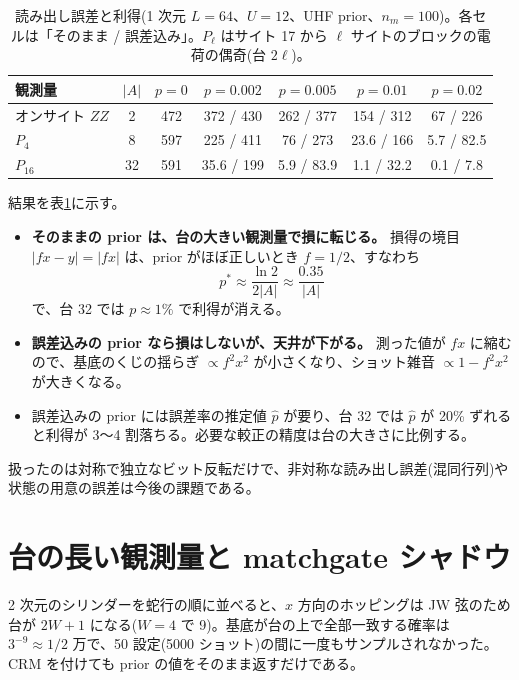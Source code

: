 \begin{table}[t]
\centering\small
\caption{読み出し誤差と利得(1 次元 $L=64$、$U=12$、UHF prior、$n_m=100$)。各セルは「そのまま / 誤差込み」。$P_\ell$ はサイト 17 から $\ell$ サイトのブロックの電荷の偶奇(台 $2\ell$)。}
\label{tab:readout}
\begin{tabular}{@{}lcccccc@{}}
\toprule
観測量 & $\lvert A\rvert$ & $p=0$ & $p=0.002$ & $p=0.005$ & $p=0.01$ & $p=0.02$ \\
\midrule
オンサイト $ZZ$ & 2 & 472 & 372 / 430 & 262 / 377 & 154 / 312 & 67 / 226 \\
$P_4$ & 8 & 597 & 225 / 411 & 76 / 273 & 23.6 / 166 & 5.7 / 82.5 \\
$P_{16}$ & 32 & 591 & 35.6 / 199 & 5.9 / 83.9 & 1.1 / 32.2 & 0.1 / 7.8 \\
\bottomrule
\end{tabular}
\end{table}

結果を表\ref{tab:readout}に示す。
\begin{itemize}
  \item \textbf{そのままの prior は、台の大きい観測量で損に転じる。} 損得の境目 $\lvert fx-y\rvert=\lvert fx\rvert$ は、prior がほぼ正しいとき $f=1/2$、すなわち
  \begin{equation}
    p^\ast\approx\frac{\ln2}{2\lvert A\rvert}\approx\frac{0.35}{\lvert A\rvert}
  \end{equation}
  で、台 32 では $p\approx1\%$ で利得が消える。
  \item \textbf{誤差込みの prior なら損はしないが、天井が下がる。} 測った値が $fx$ に縮むので、基底のくじの揺らぎ $\propto f^2x^2$ が小さくなり、ショット雑音 $\propto1-f^2x^2$ が大きくなる。
  \item 誤差込みの prior には誤差率の推定値 $\hat p$ が要り、台 32 では $\hat p$ が 20\% ずれると利得が 3〜4 割落ちる。必要な較正の精度は台の大きさに比例する。
\end{itemize}
扱ったのは対称で独立なビット反転だけで、非対称な読み出し誤差(混同行列)や状態の用意の誤差は今後の課題である。

\section{台の長い観測量と matchgate シャドウ}
\label{sec:matchgate}

2 次元のシリンダーを蛇行の順に並べると、$x$ 方向のホッピングは JW 弦のため台が $2W+1$ になる($W=4$ で 9)。基底が台の上で全部一致する確率は $3^{-9}\approx1/2$ 万で、50 設定(5000 ショット)の間に一度もサンプルされなかった。CRM を付けても prior の値をそのまま返すだけである。

